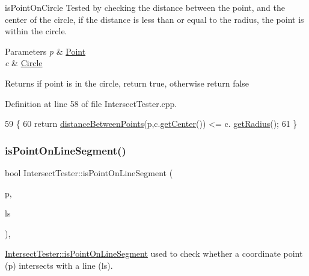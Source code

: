 is\+Point\+On\+Circle Tested by checking the distance between the point, and the center of the circle, if the distance is less than or equal to the radius, the point is within the circle. 


\begin{DoxyParams}{Parameters}
{\em p} & \hyperlink{class_point}{Point} \\
\hline
{\em c} & \hyperlink{class_circle}{Circle} \\
\hline
\end{DoxyParams}
\begin{DoxyReturn}{Returns}
if point is in the circle, return true, otherwise return false 
\end{DoxyReturn}


Definition at line 58 of file Intersect\+Tester.\+cpp.


\begin{DoxyCode}
59 \{
60     \textcolor{keywordflow}{return} \hyperlink{class_intersect_tester_a8eea20bc180b49008d29002fc4e2c7cf}{distanceBetweenPoints}(p,c.\hyperlink{class_circle_a9818ca0bbac64ff447945a8e51ff9319}{getCenter}()) <= c.
      \hyperlink{class_circle_a95b7dc25d2e9b1e40a189cd83386a12e}{getRadius}();
61 \}
\end{DoxyCode}
\mbox{\label{class_intersect_tester_a95ba0d50e91eb8559aa3c6a4dc0d4c0f}} 
\subsubsection{\texorpdfstring{is\+Point\+On\+Line\+Segment()}{isPointOnLineSegment()}}
{\footnotesize\ttfamily bool Intersect\+Tester\+::is\+Point\+On\+Line\+Segment (\begin{DoxyParamCaption}\item[{\hyperlink{class_point}{Point}}]{p,  }\item[{\hyperlink{class_line_segment}{Line\+Segment}}]{ls }\end{DoxyParamCaption})\hspace{0.3cm}{\ttfamily [static]}, {\ttfamily [private]}}



\hyperlink{class_intersect_tester_a95ba0d50e91eb8559aa3c6a4dc0d4c0f}{Intersect\+Tester\+::is\+Point\+On\+Line\+Segment} used to check whether a coordinate point (p) intersects with a line (ls). 


